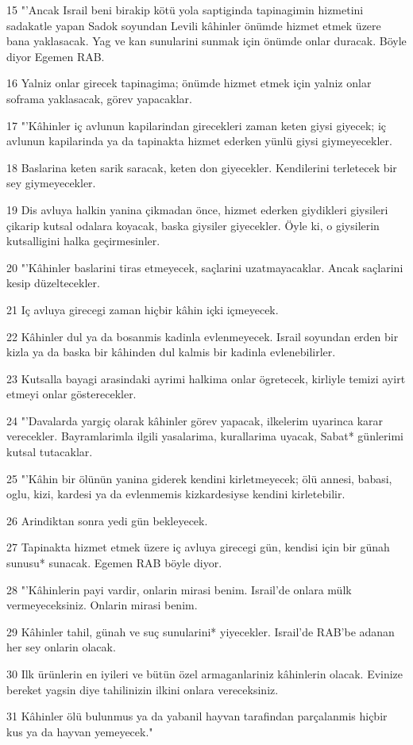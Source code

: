 \par 15 "'Ancak Israil beni birakip kötü yola saptiginda tapinagimin hizmetini sadakatle yapan Sadok soyundan Levili kâhinler önümde hizmet etmek üzere bana yaklasacak. Yag ve kan sunularini sunmak için önümde onlar duracak. Böyle diyor Egemen RAB.
\par 16 Yalniz onlar girecek tapinagima; önümde hizmet etmek için yalniz onlar soframa yaklasacak, görev yapacaklar.
\par 17 "'Kâhinler iç avlunun kapilarindan girecekleri zaman keten giysi giyecek; iç avlunun kapilarinda ya da tapinakta hizmet ederken yünlü giysi giymeyecekler.
\par 18 Baslarina keten sarik saracak, keten don giyecekler. Kendilerini terletecek bir sey giymeyecekler.
\par 19 Dis avluya halkin yanina çikmadan önce, hizmet ederken giydikleri giysileri çikarip kutsal odalara koyacak, baska giysiler giyecekler. Öyle ki, o giysilerin kutsalligini halka geçirmesinler.
\par 20 "'Kâhinler baslarini tiras etmeyecek, saçlarini uzatmayacaklar. Ancak saçlarini kesip düzeltecekler.
\par 21 Iç avluya girecegi zaman hiçbir kâhin içki içmeyecek.
\par 22 Kâhinler dul ya da bosanmis kadinla evlenmeyecek. Israil soyundan erden bir kizla ya da baska bir kâhinden dul kalmis bir kadinla evlenebilirler.
\par 23 Kutsalla bayagi arasindaki ayrimi halkima onlar ögretecek, kirliyle temizi ayirt etmeyi onlar gösterecekler.
\par 24 "'Davalarda yargiç olarak kâhinler görev yapacak, ilkelerim uyarinca karar verecekler. Bayramlarimla ilgili yasalarima, kurallarima uyacak, Sabat* günlerimi kutsal tutacaklar.
\par 25 "'Kâhin bir ölünün yanina giderek kendini kirletmeyecek; ölü annesi, babasi, oglu, kizi, kardesi ya da evlenmemis kizkardesiyse kendini kirletebilir.
\par 26 Arindiktan sonra yedi gün bekleyecek.
\par 27 Tapinakta hizmet etmek üzere iç avluya girecegi gün, kendisi için bir günah sunusu* sunacak. Egemen RAB böyle diyor.
\par 28 "'Kâhinlerin payi vardir, onlarin mirasi benim. Israil'de onlara mülk vermeyeceksiniz. Onlarin mirasi benim.
\par 29 Kâhinler tahil, günah ve suç sunularini* yiyecekler. Israil'de RAB'be adanan her sey onlarin olacak.
\par 30 Ilk ürünlerin en iyileri ve bütün özel armaganlariniz kâhinlerin olacak. Evinize bereket yagsin diye tahilinizin ilkini onlara vereceksiniz.
\par 31 Kâhinler ölü bulunmus ya da yabanil hayvan tarafindan parçalanmis hiçbir kus ya da hayvan yemeyecek."


